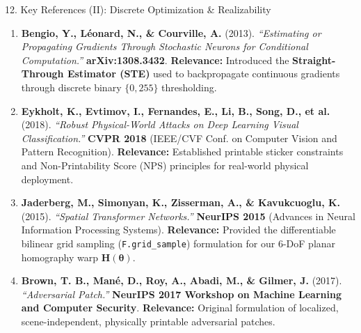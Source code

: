 \documentclass[aspectratio=169, 10pt]{beamer}
\begin{document}
\begin{frame}{12. Key References (II): Discrete Optimization \& Realizability}
\scriptsize

\begin{enumerate}
    \setlength{\itemsep}{6pt}

    \item \textbf{Bengio, Y., L{\'e}onard, N., \& Courville, A.} (2013).  
    \textit{``Estimating or Propagating Gradients Through Stochastic Neurons for Conditional Computation.''}  
    \textbf{arXiv:1308.3432}.  
    \textcolor{NavyBlue}{\textbf{Relevance:}} Introduced the \textbf{Straight-Through Estimator (STE)} used to backpropagate continuous gradients through discrete binary $\{0, 255\}$ thresholding.

    \item \textbf{Eykholt, K., Evtimov, I., Fernandes, E., Li, B., Song, D., et al.} (2018).  
    \textit{``Robust Physical-World Attacks on Deep Learning Visual Classification.''}  
    \textbf{CVPR 2018} (IEEE/CVF Conf. on Computer Vision and Pattern Recognition).  
    \textcolor{NavyBlue}{\textbf{Relevance:}} Established printable sticker constraints and Non-Printability Score (NPS) principles for real-world physical deployment.

    \item \textbf{Jaderberg, M., Simonyan, K., Zisserman, A., \& Kavukcuoglu, K.} (2015).  
    \textit{``Spatial Transformer Networks.''}  
    \textbf{NeurIPS 2015} (Advances in Neural Information Processing Systems).  
    \textcolor{NavyBlue}{\textbf{Relevance:}} Provided the differentiable bilinear grid sampling (\texttt{F.grid\_sample}) formulation for our 6-DoF planar homography warp $\mathbf{H}(\boldsymbol{\theta})$.

    \item \textbf{Brown, T. B., Man{\'e}, D., Roy, A., Abadi, M., \& Gilmer, J.} (2017).  
    \textit{``Adversarial Patch.''}  
    \textbf{NeurIPS 2017 Workshop on Machine Learning and Computer Security}.  
    \textcolor{NavyBlue}{\textbf{Relevance:}} Original formulation of localized, scene-independent, physically printable adversarial patches.

\end{enumerate}
\end{frame}
\end{document}

